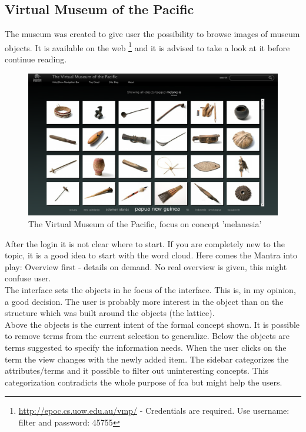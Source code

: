 \documentclass[11pt]{report}
\begin{document}
{{\subsection{Virtual Museum of the Pacific}
 
The museum was created to give user the possibility to browse images of museum objects. It is available on the web \footnote{\url{http://epoc.cs.uow.edu.au/vmp/} - Credentials are required. Use username: filter and password: 45755} and it is advised to take a look at it before continue reading. \\

\begin{figure}[!ht]
	\centering
	\includegraphics[width=\linewidth]{images/pacific}
\caption{The Virtual Museum of the Pacific, focus on concept 'melanesia'}
\label{figure:pacific}
\end{figure}

After the login it is not clear where to start. If you are completely new to the topic, it is a good idea to start with the word cloud. Here comes the Mantra into play: Overview first - details on demand. No real overview is given, this might confuse user. \\
 
 The interface sets the objects in he focus of the interface. This is, in my opinion, a good decision. The user is probably more interest in the object than on the structure which was built around the objects (the lattice). \\
 
 Above the objects is the current intent of the formal concept shown. It is possible to remove terms from the current selection to generalize. Below the objects are terms suggested to specify the information needs. When the user clicks on the term the view changes with the newly added item. The sidebar categorizes the attributes/terms and it possible to filter out uninteresting concepts. This categorization contradicts the whole purpose of \acrshort{fca} but might help the users. \\
 
}}
\end{document}

